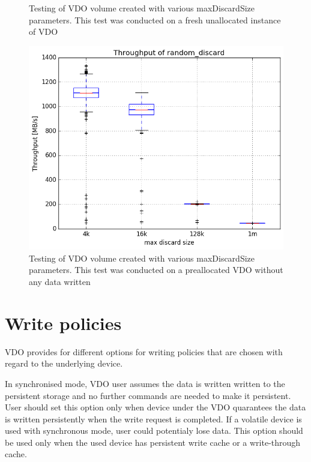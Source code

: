\documentclass[
  color, %
  table, %
  lof,   %
  lot,   %
]{fithesis3}
\begin{document}
\begin{figure}[!htb]
\caption[Discards]{Testing of VDO volume created with various maxDiscardSize parameters. This test was conducted on a fresh unallocated instance of VDO}
\label{fig:discard-unalloc}
\end{figure}


\begin{figure}[!htb]
        \centering
        \includegraphics[width=\textwidth]{../results/discards/empty_VDO/report/random_discard1_compare_boxplots}
\caption[Discards]{Testing of VDO volume created with various maxDiscardSize parameters. This test was conducted on a preallocated VDO without any data written}
\label{fig:discard-empty}
\end{figure}



\clearpage

\section{Write policies}
VDO provides for different options for writing policies that are chosen with regard to the underlying device. 

In synchronised mode, VDO user assumes the data is written written to the persistent storage and no further commands are needed to make it persistent. User should set this option only when device under the VDO quarantees the data is written persistently when the write request is completed. If a volatile device is used with synchronous mode, user could potentialy lose data. This option should be used only when the used device has persistent write cache or a write-through cache.
\end{document}
